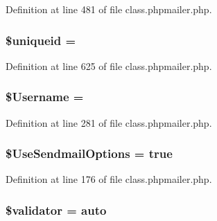 Definition at line 481 of file class.\+phpmailer.\+php.

\subsubsection[{\texorpdfstring{\$uniqueid}{$uniqueid}}]{\setlength{\rightskip}{0pt plus 5cm}\$uniqueid = \textquotesingle{}\textquotesingle{}\hspace{0.3cm}{\ttfamily [protected]}}\hypertarget{class_p_h_p_mailer_ab47f297d32c3522f1f7d42ed911157fd}{}\label{class_p_h_p_mailer_ab47f297d32c3522f1f7d42ed911157fd}


Definition at line 625 of file class.\+phpmailer.\+php.

\subsubsection[{\texorpdfstring{\$\+Username}{$Username}}]{\setlength{\rightskip}{0pt plus 5cm}\$Username = \textquotesingle{}\textquotesingle{}}\hypertarget{class_p_h_p_mailer_a0e2ea0d42b9b800eb5bf8660587f5f7f}{}\label{class_p_h_p_mailer_a0e2ea0d42b9b800eb5bf8660587f5f7f}


Definition at line 281 of file class.\+phpmailer.\+php.

\subsubsection[{\texorpdfstring{\$\+Use\+Sendmail\+Options}{$UseSendmailOptions}}]{\setlength{\rightskip}{0pt plus 5cm}\$Use\+Sendmail\+Options = true}\hypertarget{class_p_h_p_mailer_a49c6457299f19cc2cb83ba1e8f98f578}{}\label{class_p_h_p_mailer_a49c6457299f19cc2cb83ba1e8f98f578}


Definition at line 176 of file class.\+phpmailer.\+php.

\subsubsection[{\texorpdfstring{\$validator}{$validator}}]{\setlength{\rightskip}{0pt plus 5cm}\$validator = \textquotesingle{}auto\textquotesingle{}\hspace{0.3cm}{\ttfamily [static]}}\hypertarget{class_p_h_p_mailer_aa4e00b38f53ef571bf77fc9c3e882972}{}\label{class_p_h_p_mailer_aa4e00b38f53ef571bf77fc9c3e882972}



